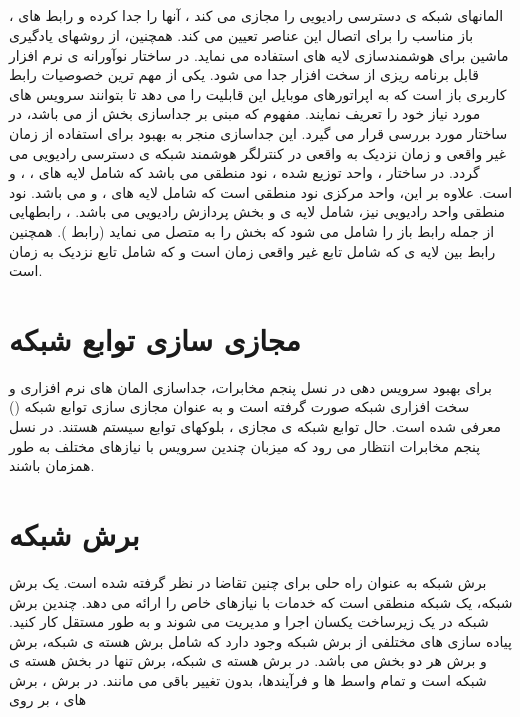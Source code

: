 \subsection{}
، المانهای شبکه ی دسترسی رادیویی را مجازی می کند ، آنها را جدا کرده و رابط های باز مناسب را 
برای اتصال این عناصر
تعیین می کند. همچنین، 
از روشهای یادگیری ماشین برای هوشمندسازی لایه های 
 استفاده می نماید. 
 در ساختار نوآورانه ی 
 نرم افزار قابل برنامه ریزی 
 از سخت افزار جدا می شود.
  یکی از مهم ترین خصوصیات
  رابط کاربری باز است که به اپراتورهای موبایل این قابلیت را می دهد تا بتوانند سرویس های مورد نیاز خود را تعریف نمایند.
  مفهوم 
  که مبنی بر جداسازی 
   بخش  از 
می باشد، در ساختار 
مورد بررسی قرار می گیرد.
این جداسازی منجر به بهبود 
برای استفاده از زمان غیر واقعی و زمان نزدیک به واقعی در کنترلگر هوشمند شبکه ی دسترسی رادیویی می گردد.
در ساختار
،
واحد توزیع شده ،
نود منطقی می باشد که شامل لایه های 
،
،
و
است.
علاوه بر این، واحد مرکزی 
نود منطقی است که شامل لایه های 
،
و 
می باشد.
نود منطقی واحد رادیویی
نیز، شامل لایه ی 
و بخش پردازش رادیویی می باشد.
،
رابطهایی از جمله رابط 
باز را شامل می شود که بخش  را به  متصل می نماید
(رابط 
). 
همچنین
 رابط 
 بین لایه ی 
  که شامل 
  تابع غیر واقعی زمان است و 
  که شامل تابع نزدیک به زمان است. 
\section{مجازی سازی توابع شبکه}
برای بهبود سرویس دهی در نسل پنجم مخابرات، جداسازی المان های نرم افزاری و سخت افزاری شبکه صورت گرفته است و به عنوان 
مجازی سازی توابع شبکه () 
معرفی شده است.
  حال توابع شبکه ی مجازی
   ،
  بلوکهای توابع سیستم هستند.
در نسل پنجم مخابرات 
  انتظار می رود که
   میزبان چندین سرویس
   با نیازهای مختلف به طور همزمان
    باشند.
 \section{برش شبکه}
 برش شبکه
به عنوان راه حلی برای چنین تقاضا در نظر گرفته شده است.
یک برش شبکه، یک شبکه منطقی  است که خدمات  با نیازهای خاص را ارائه می دهد.
 چندین برش شبکه
در یک زیرساخت یکسان
  اجرا و مدیریت می شوند و
به طور مستقل کار کنید.
پیاده سازی های مختلفی از برش شبکه وجود دارد که شامل برش هسته ی شبکه، برش  و برش هر دو بخش می باشد.
در برش هسته ی شبکه، برش تنها در بخش هسته ی شبکه است و تمام واسط ها و فرآیندها، بدون تغییر باقی می مانند.
در برش ، 
برش های ، بر روی   